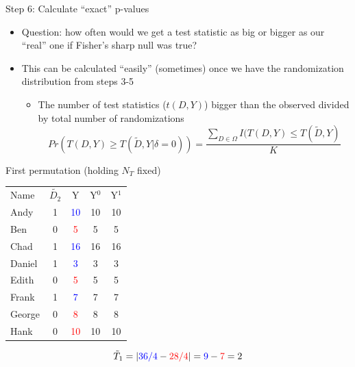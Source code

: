 \documentclass{beamer}
\begin{document}
\begin{frame}{Step 6: Calculate ``exact'' p-values}

\begin{itemize}
\item Question: how often would we get a test statistic as big or bigger as our ``real'' one if Fisher's sharp null was true?
\item This can be calculated ``easily'' (sometimes) once we have the randomization distribution from steps 3-5
	\begin{itemize}
	\item The number of test statistics ($t(D,Y)$) bigger than the observed divided by total number of randomizations $$Pr(T(D,Y) \geq T(\tilde{D},Y | \delta = 0)) = \frac{ \sum_{D \in \Omega} I(T(D,Y) \leq T(\tilde{D},Y)}{K}$$
	\end{itemize}
\end{itemize}
\end{frame}







\begin{frame}{First permutation (holding $N_T$ fixed)}

\begin{table}[htbp]\centering
\begin{center}
\begin{threeparttable}
\begin{tabular}{lcccc}
\toprule
\multicolumn{1}{l}{Name}&
\multicolumn{1}{c}{$\tilde{D_2}$}&
\multicolumn{1}{c}{Y}&
\multicolumn{1}{c}{Y$^0$}&
\multicolumn{1}{c}{Y$^1$}\\
Andy		& 1 & \textcolor{blue}{10}  & {10} & 10 \\
Ben		& 0 & \textcolor{red}{5}    & {5} & 5 \\
Chad	& 1 & \textcolor{blue}{16}  & {16} & 16 \\	
Daniel	& 1 &  \textcolor{blue}{3}   & {3} & 3 \\
Edith		& 0 & \textcolor{red}{5}    & 5 & {5} \\
Frank	& 1 & \textcolor{blue}{7}    & 7& {7}  \\
George	& 0 & \textcolor{red}{8}    & 8 & {8} \\
Hank		& 0 & \textcolor{red}{10}  & 10 & {10} \\
\bottomrule
\end{tabular}
\end{threeparttable}
\end{center}
\end{table}

$$\tilde{T}_1 =  | \textcolor{blue}{36/4} - \textcolor{red}{28/4}  | = \textcolor{blue}{9} - \textcolor{red}{7} = 2$$
	
\end{frame}
\end{document}
